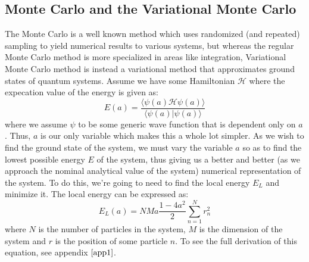 \documentclass{article}
\begin{document}
\subsection{Monte Carlo and the Variational Monte Carlo} \label{mc}
The Monte Carlo is a well known method which uses randomized (and repeated) sampling to yield numerical results to various systems, but whereas the regular Monte Carlo method is more specialized in areas like integration, Variational Monte Carlo method is instead a variational method that approximates ground states of quantum systems. \newline
Assume we have some Hamiltonian $\mathcal{H}$ where the expecation value of the energy is given as:
\begin{equation*}
    E(a) = \frac{\langle \psi(a) \mathcal{H} \psi (a) \rangle}{\langle \psi (a) | \psi (a) \rangle}
\end{equation*}
where we assume $\psi$ to be some generic wave function that is dependent only on $a$. Thus, $a$ is our only variable which makes this a whole lot simpler. \newline
As we wish to find the ground state of the system, we must vary the variable $a$ so as to find the lowest possible energy $E$ of the system, thus giving us a better and better (as we approach the nominal analytical value of the system) numerical representation of the system. To do this, we're going to need to find the local energy $E_L$ and minimize it. The local energy can be expressed as:
\begin{equation} \label{linear}
    E_L(a) = N M a \frac{1-4a^2}{2} \sum_{n=1}^N r_n^2
\end{equation}
where $N$ is the number of particles in the system, $M$ is the dimension of the system and $r$ is the position of some particle $n$. To see the full derivation of this equation, see appendix $\ref{app1}$.
\end{document}
